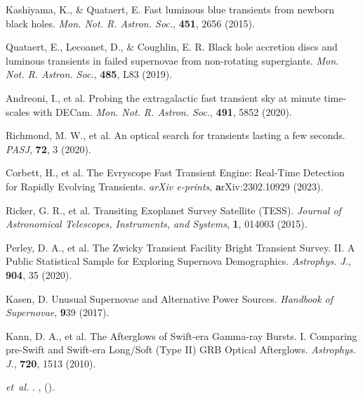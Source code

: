 \documentclass{nature_plusfigure}
\newcommand{\mn}{{Mon. Not. R. Astron. Soc.}}
\newcommand{\mnras}{\mn}
\newcommand{\apj}{{Astrophys. J.}}
\newcommand{\apjl}{{Astrophys. J. Lett.}}
\newcommand{\pasj}{{PASJ}}
\begin{document}
\begin{thebibliography}{100}
 Kashiyama, K., \& Quataert, E. Fast luminous blue transients from newborn black holes. \emph{\mnras}, \textbf{451}, 2656 (2015). 

  Quataert, E., Lecoanet, D., \& Coughlin, E. R. Black hole accretion discs and luminous transients in failed supernovae from non-rotating supergiants. \emph{\mnras}, \textbf{485}, L83 (2019). 


 Andreoni, I., et al. Probing the extragalactic fast transient sky at minute time-scales with DECam. \emph{\mnras}, \textbf{491}, 5852 (2020). 

 Richmond, M. W., et al. An optical search for transients lasting a few seconds. \emph{\pasj}, \textbf{72}, 3 (2020). 

 Corbett, H., et al. The Evryscope Fast Transient Engine: Real-Time Detection for Rapidly Evolving Transients. \emph{arXiv e-prints}, \textbf arXiv:2302.10929 (2023). 


  Ricker, G. R., et al. Transiting Exoplanet Survey Satellite (TESS). \emph{Journal of Astronomical Telescopes, Instruments, and Systems}, \textbf{1}, 014003 (2015). 
 
 
  Perley, D. A., et al. The Zwicky Transient Facility Bright Transient Survey. II. A Public Statistical Sample for Exploring Supernova Demographics. \emph{\apj}, \textbf{904}, 35 (2020). 
 
  Kasen, D. Unusual Supernovae and Alternative Power Sources. \emph{Handbook of Supernovae}, \textbf 939 (2017). 
 
 
 
  Kann, D. A., et al. The Afterglows of Swift-era Gamma-ray Bursts. I. Comparing pre-Swift and Swift-era Long/Soft (Type II) GRB Optical Afterglows. \emph{\apj}, \textbf{720}, 1513 (2010). 
 
 \emph{et~al.}
\newblock {}.
\newblock \emph{\bibinfo{journal}{\apjl}} \textbf{},
   ().


\end{thebibliography}
\end{document}
